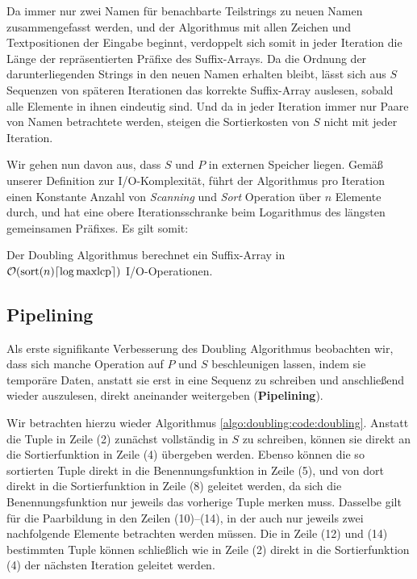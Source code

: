 Da immer nur zwei Namen für benachbarte Teilstrings zu neuen Namen zusammengefasst werden, und der Algorithmus mit allen Zeichen und Textpositionen der Eingabe beginnt, verdoppelt sich somit in jeder Iteration die Länge der repräsentierten Präfixe des Suffix-Arrays. Da die Ordnung der darunterliegenden Strings in den neuen Namen erhalten bleibt, lässt sich aus $S$ Sequenzen von späteren Iterationen das korrekte Suffix-Array auslesen, sobald alle Elemente in ihnen eindeutig sind. Und da in jeder Iteration immer nur Paare von Namen betrachtete werden, steigen die Sortierkosten von $S$ nicht mit jeder Iteration.

Wir gehen nun davon aus, dass $S$ und $P$ in externen Speicher liegen. Gemäß unserer Definition zur I/O-Komplexität, führt der Algorithmus pro Iteration einen Konstante Anzahl von \textit{Scanning} und \textit{Sort} Operation über $n$ Elemente durch, und hat eine obere Iterationsschranke beim Logarithmus des längsten gemeinsamen Präfixes. Es gilt somit:

\begin{theorem}
Der Doubling Algorithmus berechnet ein Suffix-Array in\\ $\mathcal{O}(\text{sort}(n) \ceil*{\log \text{maxlcp}})$ I/O-Operationen.
\end{theorem}

\subsection{Pipelining}
\label{algo:doubling:sec:pipelining}

Als erste signifikante Verbesserung des Doubling Algorithmus beobachten wir, dass sich manche Operation auf $P$ und $S$ beschleunigen lassen, indem sie temporäre Daten, anstatt sie erst in eine Sequenz zu schreiben und anschließend wieder auszulesen, direkt aneinander weitergeben (\textbf{Pipelining}). 

Wir betrachten hierzu wieder Algorithmus \ref{algo:doubling:code:doubling}. Anstatt die Tuple in Zeile (2) zunächst vollständig in $S$ zu schreiben, können sie direkt an die Sortierfunktion in Zeile (4) übergeben werden. Ebenso können die so sortierten Tuple direkt in die Benennungsfunktion in Zeile (5), und von dort direkt in die Sortierfunktion in Zeile (8) geleitet werden, da sich die Benennungsfunktion nur jeweils das vorherige Tuple merken muss. Dasselbe gilt für die Paarbildung in den Zeilen (10)--(14), in der auch nur jeweils zwei nachfolgende Elemente betrachten werden müssen. Die in Zeile (12) und (14) bestimmten Tuple können schließlich wie in Zeile (2) direkt in die Sortierfunktion (4) der nächsten Iteration geleitet werden.

